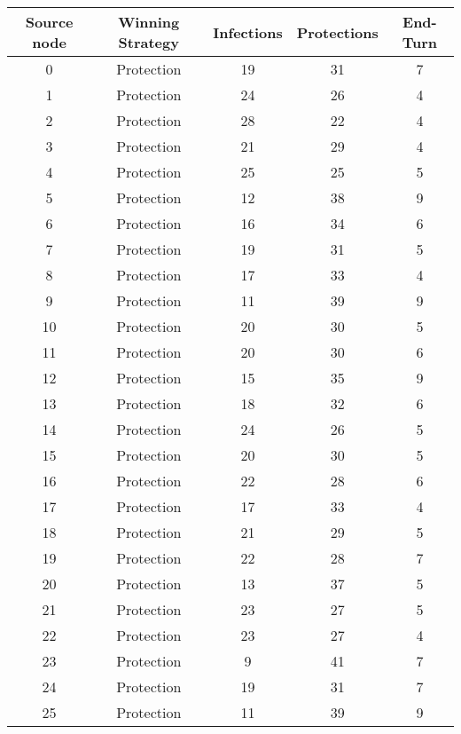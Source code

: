 \documentclass[results.tex]{subfiles}
\begin{document}
\begin{center}
  \begin{tabular}{| c || c | c | c | c |}
    \hline
    {\bfseries Source node} & {\bfseries Winning Strategy} & {\bfseries Infections} & {\bfseries Protections} & {\bfseries End-Turn} \\  %
    \hline\hline
    0 & Protection & 19 & 31 & 7 \\ 
    \hline
    1 & Protection & 24 & 26 & 4 \\ 
    \hline
    2 & Protection & 28 & 22 & 4 \\ 
    \hline
    3 & Protection & 21 & 29 & 4 \\ 
    \hline
    4 & Protection & 25 & 25 & 5 \\ 
    \hline
    5 & Protection & 12 & 38 & 9 \\ 
    \hline
    6 & Protection & 16 & 34 & 6 \\ 
    \hline
    7 & Protection & 19 & 31 & 5 \\ 
    \hline
    8 & Protection & 17 & 33 & 4 \\ 
    \hline
    9 & Protection & 11 & 39 & 9 \\ 
    \hline
    10 & Protection & 20 & 30 & 5 \\ 
    \hline
    11 & Protection & 20 & 30 & 6 \\ 
    \hline
    12 & Protection & 15 & 35 & 9 \\ 
    \hline
    13 & Protection & 18 & 32 & 6 \\ 
    \hline
    14 & Protection & 24 & 26 & 5 \\ 
    \hline
    15 & Protection & 20 & 30 & 5 \\ 
    \hline
    16 & Protection & 22 & 28 & 6 \\ 
    \hline
    17 & Protection & 17 & 33 & 4 \\ 
    \hline
    18 & Protection & 21 & 29 & 5 \\ 
    \hline
    19 & Protection & 22 & 28 & 7 \\ 
    \hline
    20 & Protection & 13 & 37 & 5 \\ 
    \hline
    21 & Protection & 23 & 27 & 5 \\ 
    \hline
    22 & Protection & 23 & 27 & 4 \\ 
    \hline
    23 & Protection & 9 & 41 & 7 \\ 
    \hline
    24 & Protection & 19 & 31 & 7 \\ 
    \hline
    25 & Protection & 11 & 39 & 9 \\ 

\end{tabular}
\end{center}
\end{document}
